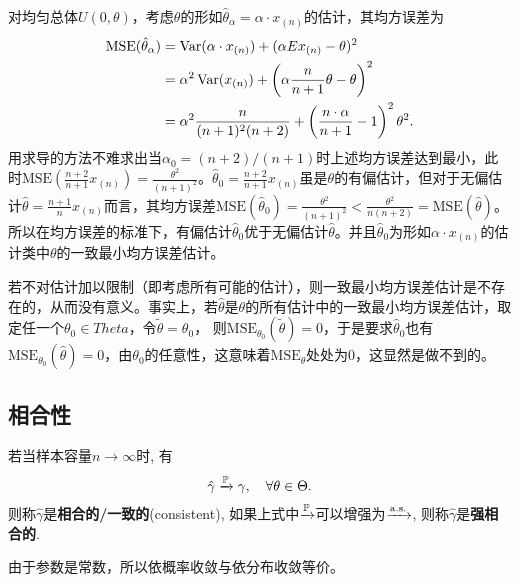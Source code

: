\begin{example}
    对均匀总体$U(0,\theta)$，考虑$\theta$的形如$\hat\theta_\alpha = \alpha\cdot x_{(n)}$的估计，其均方误差为
    \begin{align*}
        \text{MSE}(\hat\theta_\alpha) & = \Var(\alpha\cdot x_{(n)}) + (\alpha Ex_{(n)} - \theta) ^2                                 \\
                                      & = \alpha^2\Var(x_{(n)}) + \left( \alpha\frac n{n+1}\theta - \theta \right)^2                \\
                                      & = \alpha^2 \frac n{(n+1)^2(n+2)} + \left( \frac{n\cdot \alpha}{n+1} - 1 \right)^2\theta^2 .
    \end{align*}
    用求导的方法不难求出当$\alpha_0=(n+2)/(n+1)$时上述均方误差达到最小，此时$\text{MSE}\left(\frac{n+2}{n+1}x_{(n)}\right)=\frac{\theta^2}{(n+1)^2}$。$\hat\theta_0=\frac{n+2}{n+1}x_{(n)}$虽是$\theta$的有偏估计，但对于无偏估计$\hat\theta=\frac{n+1}{n}x_{(n)}$而言，其均方误差$\text{MSE}(\hat\theta_0)=\frac{\theta^2}{(n+1)^2}<\frac{\theta^2}{n(n+2)}=\text{MSE}(\hat\theta)$。所以在均方误差的标准下，有偏估计$\hat\theta_0$优于无偏估计$\hat\theta$。并且$\hat\theta_0$为形如$\alpha\cdot x_{(n)}$的估计类中$\theta$的一致最小均方误差估计。
\end{example}

若不对估计加以限制（即考虑所有可能的估计），则一致最小均方误差估计是不存在的，从而没有意义。事实上，若$\hat\theta$是$\theta$的所有估计中的一致最小均方误差估计，取定任一个$\theta_0 \in Theta$，令$\tilde\theta=\theta_0$， 则$\text{MSE}_{\theta_0}(\tilde\theta)=0$，于是要求$\hat\theta_0$也有$\text{MSE}_{\theta_0}(\hat\theta)=0$，由$\theta_0$的任意性，这意味着$\text{MSE}_{\theta}$处处为$0$，这显然是做不到的。

\subsection{相合性}

\begin{definition}[相合]
    若当样本容量$n\to\infty$时, 有
    \[ \hat{\gamma} \xrightarrow{\P} \gamma, \quad \forall \theta\in\Theta. \]
    则称$\hat{\gamma}$是\textbf{相合的/一致的}(consistent), 如果上式中$\xrightarrow{\P}$可以增强为$\xrightarrow{\as}$, 则称$\hat{\gamma}$是\textbf{强相合的}.
\end{definition}
\begin{remark}
    由于参数是常数，所以依概率收敛与依分布收敛等价。
\end{remark}

